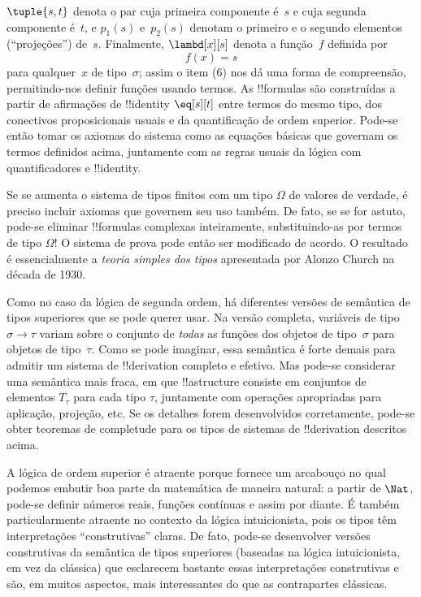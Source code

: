 \documentclass[../../../include/open-logic-section]{subfiles}
\begin{document}
$\tuple{s, t}$ denota o par cuja primeira componente é~$s$ e cuja
segunda componente é~$t$, e $p_1(s)$ e~$p_2(s)$ denotam o primeiro
e o segundo elementos (``projeções'') de~$s$. Finalmente, $\lambd[x][s]$
denota a função~$f$ definida por
\[
f(x) = s
\]
para qualquer~$x$ de tipo~$\sigma$; assim o item (6) nos dá uma forma de
compreensão, permitindo-nos definir funções usando
termos. As !!{formula}s são construídas a partir de afirmações de
!!{identity} $\eq[s][t]$ entre termos do mesmo tipo, dos conectivos
proposicionais usuais e da quantificação de ordem superior. Pode-se então
tomar os axiomas do sistema como as equações básicas que governam os
termos definidos acima, juntamente com as regras usuais da lógica com
quantificadores e !!{identity}.

Se se aumenta o sistema de tipos finitos com um tipo $\Omega$ de valores
de verdade, é preciso incluir axiomas que governem seu uso também. De
fato, se se for astuto, pode-se eliminar !!{formula}s complexas
inteiramente, substituindo-as por termos de tipo $\Omega$!{} O sistema de
prova pode então ser modificado de acordo. O resultado é essencialmente a
\emph{teoria simples dos tipos} apresentada por Alonzo Church na década de
1930.

Como no caso da lógica de segunda ordem, há diferentes versões de
semântica de tipos superiores que se pode querer usar. Na versão completa,
variáveis de tipo $\sigma \to \tau$ variam sobre o conjunto de \emph{todas}
as funções dos objetos de tipo~$\sigma$ para objetos de tipo~$\tau$.
Como se pode imaginar, essa semântica é forte demais para admitir um
sistema de !!{derivation} completo e efetivo. Mas pode-se considerar uma
semântica mais fraca, em que !!a{structure} consiste em conjuntos de
elementos $T_\tau$ para cada tipo $\tau$, juntamente com operações
apropriadas para aplicação, projeção, etc. Se os detalhes forem
desenvolvidos corretamente, pode-se obter teoremas de completude para os
tipos de sistemas de !!{derivation} descritos acima.

A lógica de ordem superior é atraente porque fornece um arcabouço no
qual podemos embutir boa parte da matemática de maneira natural: a partir
de $\Nat$, pode-se definir números reais, funções contínuas e assim por
diante. É também particularmente atraente no contexto da lógica
intuicionista, pois os tipos têm interpretações ``construtivas'' claras.
De fato, pode-se desenvolver versões construtivas da semântica de tipos
superiores (baseadas na lógica intuicionista, em vez da clássica) que
esclarecem bastante essas interpretações construtivas e são, em muitos
aspectos, mais interessantes do que as contrapartes clássicas.
\end{document}
